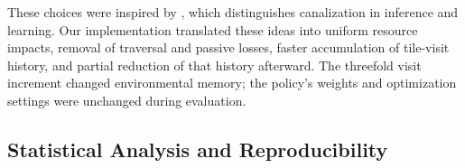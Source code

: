 \documentclass[12pt,fleqn]{article}
\begin{document}
These choices were inspired by \cite{juliani_deep_2024}, which distinguishes canalization in inference and learning. Our implementation translated these ideas into uniform resource impacts, removal of traversal and passive losses, faster accumulation of tile-visit history, and partial reduction of that history afterward. The threefold visit increment changed environmental memory; the policy's weights and optimization settings were unchanged during evaluation.
\subsection{Statistical Analysis and Reproducibility}
\end{document}

